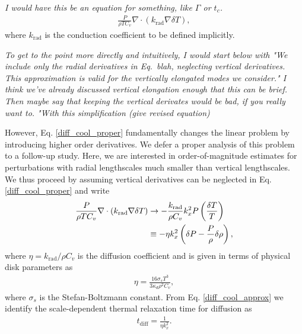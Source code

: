 {\emph{I would have this be an equation for something, like $\Gamma$ or $t_c$.}
\begin{align}\label{diff_cool_proper}
  \frac{P}{\rho T C_v} \nabla\cdot\left(k_\mathrm{rad}\nabla\delta
    T\right),  
\end{align}
where $k_\mathrm{rad}$ is the conduction coefficient to be defined
implicitly. 

\emph{To get to the point more directly and intuitively, I would start below with "We include only the radial derivatives in Eq.\ blah, neglecting vertical derivatives.  This approximation is valid for the vertically elongated modes we consider."  I think we've already discussed vertical elongation enough that this can be brief.  Then maybe say that keeping the vertical derivates would be bad, if you really want to.  "With this simplification (give revised equation)}

However, Eq. \ref{diff_cool_proper} fundamentally changes the linear
problem by introducing higher order derivatives. We defer a proper
analysis of this problem to a follow-up study. Here, we are interested
in order-of-magnitude estimates for perturbations with radial
lengthscales much smaller than vertical lengthscales. We thus proceed 
by assuming vertical derivatives can be neglected in 
Eq. \ref{diff_cool_proper} and write  
\begin{align}\label{diff_cool_approx}
  \frac{P}{\rho T C_v} \nabla\cdot\left(k_\mathrm{rad}\nabla\delta
    T\right) &\to -\frac{k_\mathrm{rad}}{\rho
    C_v}k_x^2P\left(\frac{\delta T}{T}\right)\notag\\
  &\equiv -\eta k_x^2 \left(\delta P - \frac{P}{\rho}\delta\rho\right), 
\end{align}
 where $\eta=k_\mathrm{rad}/\rho C_v$ is
the diffusion coefficient and 
is given in terms of physical disk parameters as 
\begin{align}\label{eta_def}
  \eta = \frac{16\sigma_s T^3}{3\kappa_d\rho^2 C_v}, 
\end{align}
where $\sigma_s$ is the Stefan-Boltzmann constant. 
From Eq. \ref{diff_cool_approx} we identify the scale-dependent thermal relaxation
time for diffusion as 
\begin{align}\label{tc_diff_cool} 
  t_\mathrm{diff} = \frac{1}{\eta k_x^2}.%
\end{align}

}
